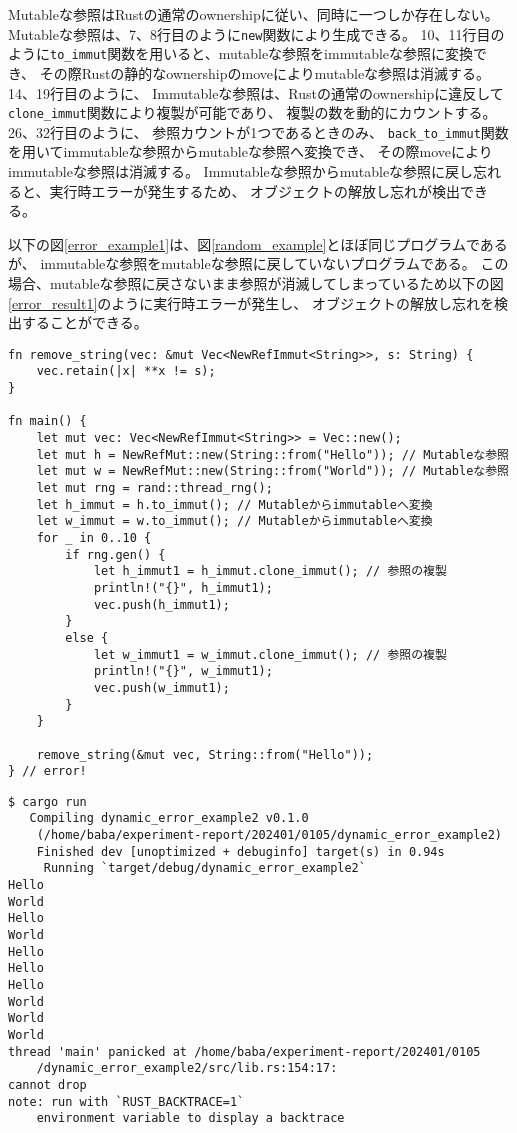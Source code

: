 \documentclass{sumiilab-paper}
\theoremstyle{mystyle}
\numberwithin{definition}{chapter} %
\begin{document}
Mutableな参照はRustの通常のownershipに従い、同時に一つしか存在しない。
Mutableな参照は、7、8行目のように\texttt{new}関数により生成できる。
10、11行目のように\texttt{to\_immut}関数を用いると、mutableな参照をimmutableな参照に変換でき、
その際Rustの静的なownershipのmoveによりmutableな参照は消滅する。
14、19行目のように、
Immutableな参照は、Rustの通常のownershipに違反して\texttt{clone\_immut}関数により複製が可能であり、
複製の数を動的にカウントする。
26、32行目のように、
参照カウントが1つであるときのみ、
\texttt{back\_to\_immut}関数を用いてimmutableな参照からmutableな参照へ変換でき、
その際moveによりimmutableな参照は消滅する。
Immutableな参照からmutableな参照に戻し忘れると、実行時エラーが発生するため、
オブジェクトの解放し忘れが検出できる。

以下の図\ref{error_example1}は、図\ref{random_example}とほぼ同じプログラムであるが、
immutableな参照をmutableな参照に戻していないプログラムである。
この場合、mutableな参照に戻さないまま参照が消滅してしまっているため以下の図\ref{error_result1}のように実行時エラーが発生し、
オブジェクトの解放し忘れを検出することができる。
\begin{lstlisting}[caption=オブジェクトの解放し忘れを検出する例, 
  label=error_example1, captionpos=b]
fn remove_string(vec: &mut Vec<NewRefImmut<String>>, s: String) {
    vec.retain(|x| **x != s);
}

fn main() {
    let mut vec: Vec<NewRefImmut<String>> = Vec::new();
    let mut h = NewRefMut::new(String::from("Hello")); // Mutableな参照
    let mut w = NewRefMut::new(String::from("World")); // Mutableな参照
    let mut rng = rand::thread_rng();
    let h_immut = h.to_immut(); // Mutableからimmutableへ変換
    let w_immut = w.to_immut(); // Mutableからimmutableへ変換
    for _ in 0..10 {
        if rng.gen() {
            let h_immut1 = h_immut.clone_immut(); // 参照の複製
            println!("{}", h_immut1);
            vec.push(h_immut1);
        }
        else {
            let w_immut1 = w_immut.clone_immut(); // 参照の複製
            println!("{}", w_immut1);
            vec.push(w_immut1);
        }
    }

    remove_string(&mut vec, String::from("Hello"));
} // error!
\end{lstlisting}
\begin{lstlisting}[caption=オブジェクトの解放し忘れのエラー, 
  label=error_result1, captionpos=b]
$ cargo run
   Compiling dynamic_error_example2 v0.1.0 
    (/home/baba/experiment-report/202401/0105/dynamic_error_example2)
    Finished dev [unoptimized + debuginfo] target(s) in 0.94s
     Running `target/debug/dynamic_error_example2`
Hello
World
Hello
World
Hello
Hello
Hello
World
World
World
thread 'main' panicked at /home/baba/experiment-report/202401/0105
    /dynamic_error_example2/src/lib.rs:154:17:
cannot drop
note: run with `RUST_BACKTRACE=1` 
    environment variable to display a backtrace
\end{lstlisting}
\end{document}
